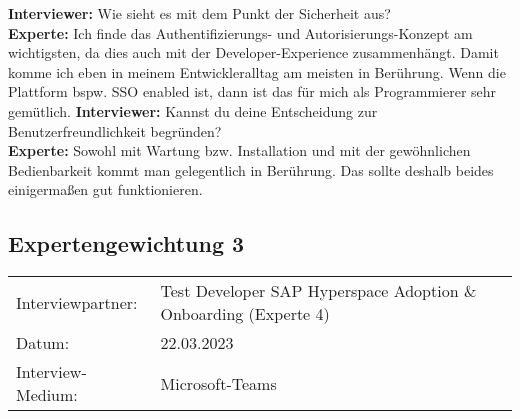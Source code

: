 \begin{linenumbers}
    \textbf{Interviewer:} Wie sieht es mit dem Punkt der Sicherheit aus?\\
    \textbf{Experte:} Ich finde das Authentifizierungs- und Autorisierungs-Konzept am wichtigsten, da dies auch mit der Developer-Experience zusammenhängt. Damit komme ich eben in meinem Entwickleralltag am meisten in Berührung. Wenn die Plattform bspw. SSO enabled ist, dann ist das für mich als Programmierer sehr gemütlich. 
    \textbf{Interviewer:} Kannst du deine Entscheidung zur Benutzerfreundlichkeit begründen?\\
    \textbf{Experte:} Sowohl mit Wartung bzw. Installation und mit der gewöhnlichen Bedienbarkeit kommt man gelegentlich in Berührung. Das sollte deshalb beides einigermaßen gut funktionieren.\\
\end{linenumbers}

\newpage
\subsection{Expertengewichtung 3}
        \begin{tabular}{ l l }
    Interviewpartner: & Test Developer SAP Hyperspace Adoption \& Onboarding (Experte 4)\\
    Datum: & 22.03.2023\\
    Interview-Medium: & Microsoft-Teams\\
\end{tabular}
\begin{center}
\begin{figure}[H]
    \centering
    \label{fig:CEA}
\end{figure}	
\end{center}
\begin{center}
\begin{figure}[H]
    \centering
    \label{fig:CEA}
\end{figure}	
\end{center}

